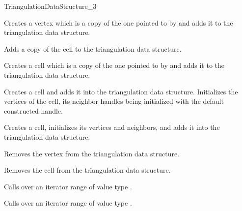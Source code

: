 \begin{ccRefConcept}{TriangulationDataStructure_3}
\begin{ccAdvanced}
{Creates a vertex which is a copy of the one pointed to by 
and adds it to the triangulation data structure.}

{Adds a copy of the cell  to the triangulation data structure.}

{Creates a cell which is a copy of the one pointed to by 
and adds it to the triangulation data structure.}

{Creates a cell and adds it into the triangulation data
structure. Initializes the vertices of the cell, its neighbor handles
being initialized with the default constructed handle.}

{Creates a cell, initializes its vertices and neighbors, and adds it
into the triangulation data structure.}

{Removes the vertex from the triangulation data structure.
}

{Removes the cell from the triangulation data structure.
}

{Calls  over an iterator range of value type
.}

{Calls  over an iterator range of value type
.}

\end{ccAdvanced}



\end{ccRefConcept}
